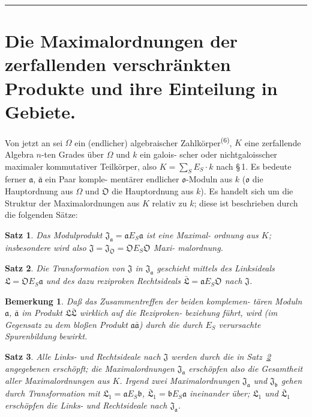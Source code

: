 \documentclass[12pt,a4paper]{article}
\theoremstyle{plain}
\newtheorem*{satz}{Satz}
\newtheorem*{bemerkung}{Bemerkung}
\begin{document}
\vspace{0.3cm}
\noindent\rule{\textwidth}{0.4pt}
\vspace{0.3cm}

\section{Die Maximalordnungen der zerfallenden verschr\"ankten Produkte
und ihre Einteilung in Gebiete.}
\label{sec:maximalordnungen}

Von jetzt an sei $\Omega$ ein (endlicher) algebraischer Zahlk\"orper\textsuperscript{(6)},
$K$ eine zerfallende Algebra $n$-ten Grades \"uber $\Omega$ und $k$ ein galois-
scher oder nichtgaloisscher maximaler kommutativer Teilk\"orper,
also $K = \sum_S E_S \cdot k$ nach \S\,1. Es bedeute ferner $\mathfrak{a}$, $\bar{\mathfrak{a}}$ ein Paar komple-
ment\"arer endlicher $\mathfrak{o}$-Moduln aus $k$ ($\mathfrak{o}$ die Hauptordnung aus $\Omega$
und $\mathfrak{O}$ die Hauptordnung aus $k$). Es handelt sich um die Struktur
der Maximalordnungen aus $K$ relativ zu $k$; diese ist beschrieben
durch die folgenden S\"atze:

\begin{satz}\label{satz:1}
Das Modulprodukt $\mathfrak{J}_{\mathfrak{a}} = \mathfrak{a} E_S \mathfrak{a}$ ist eine Maximal-
ordnung aus $K$; insbesondere wird also $\mathfrak{J} = \mathfrak{J}_{\mathfrak{O}} = \mathfrak{O} E_S \mathfrak{O}$ Maxi-
malordnung.
\end{satz}

\begin{satz}\label{satz:2}
Die Transformation von $\mathfrak{J}$ in $\mathfrak{J}_{\mathfrak{a}}$ geschieht mittels
des Linksideals $\mathfrak{L} = \mathfrak{O} E_S \mathfrak{a}$ und des dazu reziproken Rechtsideals
$\bar{\mathfrak{L}} = \mathfrak{a} E_S \mathfrak{O}$ nach $\mathfrak{J}$.
\end{satz}

\begin{bemerkung}
Da\ss{} das Zusammentreffen der beiden komplemen-
t\"aren Moduln $\mathfrak{a}$, $\bar{\mathfrak{a}}$ im Produkt $\mathfrak{L} \bar{\mathfrak{L}}$ wirklich auf die Reziproken-
beziehung f\"uhrt, wird (im Gegensatz zu dem blo\ss en Produkt $\mathfrak{a} \bar{\mathfrak{a}}$)
durch die durch $E_S$ verursachte Spurenbildung bewirkt.
\end{bemerkung}

\begin{satz}\label{satz:3}
Alle Links- und Rechtsideale nach $\mathfrak{J}$ werden durch
die in Satz~\ref{satz:2} angegebenen ersch\"opft; die Maximalordnungen
$\mathfrak{J}_{\mathfrak{a}}$ ersch\"opfen also die Gesamtheit aller Maximalordnungen
aus $K$. Irgend zwei Maximalordnungen $\mathfrak{J}_{\mathfrak{a}}$ und $\mathfrak{J}_{\mathfrak{b}}$ gehen
durch Transformation mit $\mathfrak{L}_1 = \mathfrak{a} E_S \mathfrak{b}$, $\bar{\mathfrak{L}}_1 = \mathfrak{b} E_S \mathfrak{a}$
ineinander \"uber; $\mathfrak{L}_1$ und $\bar{\mathfrak{L}}_1$ ersch\"opfen die Links- und Rechtsideale nach $\mathfrak{J}_{\mathfrak{a}}$.
\end{satz}
\end{document}
